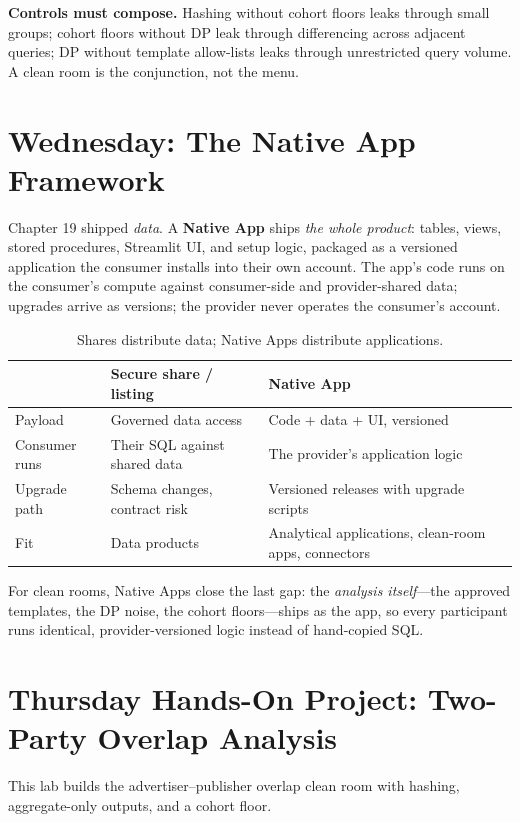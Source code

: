 \begin{pitfall}
\textbf{Controls must compose.} Hashing without cohort floors leaks through small groups; cohort floors without DP leak through differencing across adjacent queries; DP without template allow-lists leaks through unrestricted query volume. A clean room is the conjunction, not the menu.
\end{pitfall}

\section{Wednesday: The Native App Framework}
Chapter 19 shipped \emph{data}. A \textbf{Native App} ships \emph{the whole product}: tables, views, stored procedures, Streamlit UI, and setup logic, packaged as a versioned application the consumer installs into their own account. The app's code runs on the consumer's compute against consumer-side and provider-shared data; upgrades arrive as versions; the provider never operates the consumer's account.

\begin{table}[H]
\centering
\small
\begin{tabular}{@{}p{4.0cm}p{4.6cm}p{4.6cm}@{}}
\toprule
 & \textbf{Secure share / listing} & \textbf{Native App} \\
\midrule
Payload & Governed data access & Code + data + UI, versioned \\
Consumer runs & Their SQL against shared data & The provider's application logic \\
Upgrade path & Schema changes, contract risk & Versioned releases with upgrade scripts \\
Fit & Data products & Analytical applications, clean-room apps, connectors \\
\bottomrule
\end{tabular}
\caption{Shares distribute data; Native Apps distribute applications.}
\label{tab:chapter20-share-vs-app}
\end{table}

For clean rooms, Native Apps close the last gap: the \emph{analysis itself}---the approved templates, the DP noise, the cohort floors---ships as the app, so every participant runs identical, provider-versioned logic instead of hand-copied SQL.

\section{Thursday Hands-On Project: Two-Party Overlap Analysis}
This lab builds the advertiser--publisher overlap clean room with hashing, aggregate-only outputs, and a cohort floor.

